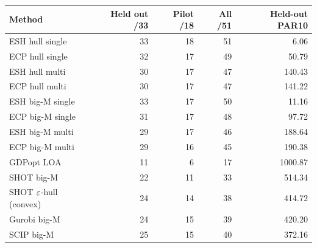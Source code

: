 \begin{tabular}{lrrrr}
\toprule
Method & Held out /33 & Pilot /18 & All /51 & Held-out PAR10 \\
\midrule
ESH hull single & 33 & 18 & 51 & 6.06 \\
ECP hull single & 32 & 17 & 49 & 50.79 \\
ESH hull multi & 30 & 17 & 47 & 140.43 \\
ECP hull multi & 30 & 17 & 47 & 141.22 \\
ESH big-M single & 33 & 17 & 50 & 11.16 \\
ECP big-M single & 31 & 17 & 48 & 97.72 \\
ESH big-M multi & 29 & 17 & 46 & 188.64 \\
ECP big-M multi & 29 & 16 & 45 & 190.38 \\
GDPopt LOA & 11 & 6 & 17 & 1000.87 \\
SHOT big-M & 22 & 11 & 33 & 514.34 \\
SHOT $\varepsilon$-hull (convex) & 24 & 14 & 38 & 414.72 \\
Gurobi big-M & 24 & 15 & 39 & 420.20 \\
SCIP big-M & 25 & 15 & 40 & 372.16 \\
\bottomrule
\end{tabular}
